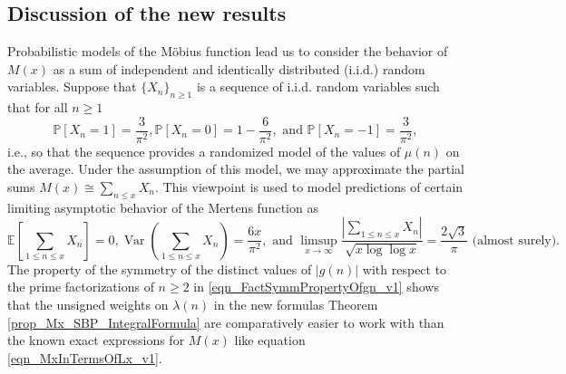 \documentclass[11pt,reqno,a4letter]{article}
\newcommand{\hlocalref}[1]{\hyperref[#1]{\ref{#1}}}
\numberwithin{equation}{section}
\numberwithin{figure}{section}
\numberwithin{table}{section}
\theoremstyle{plain}
\numberwithin{theorem}{section}
\theoremstyle{definition}
\begin{document}
\subsection{Discussion of the new results}

Probabilistic models of the M\"obius function lead us to consider the behavior of $M(x)$ 
as a sum of independent and identically distributed (i.i.d.) random variables. 
Suppose that $\{X_n\}_{n \geq 1}$ is a sequence of i.i.d. random variables 
such that for all $n \geq 1$ 
$$\mathbb{P}[X_n = 1] = \frac{3}{\pi^2}, \mathbb{P}[X_n = 0] = 1 - \frac{6}{\pi^2}, \text{ and }  
  \mathbb{P}[X_n = -1] = \frac{3}{\pi^2},$$ 
i.e., so that the sequence provides a randomized model of the values of $\mu(n)$ on the average. 
Under the assumption of this model, we may approximate the partial sums 
$M(x) \cong \sum_{n \leq x} X_n$. 
This viewpoint is used to model predictions of certain limiting asymptotic behavior of the 
Mertens function as 
\[
\mathbb{E}\left[\sum_{1 \leq n \leq x} X_n\right] = 0, 
     \operatorname{Var}\left(\sum_{1 \leq n \leq x} X_n\right) = \frac{6x}{\pi^2}, 
     \text{ and } 
     \limsup_{x \rightarrow \infty} \frac{\left\lvert \sum\limits_{1 \leq n \leq x} X_n 
     \right\rvert}{\sqrt{x \log\log x}} = \frac{2\sqrt{3}}{\pi}
     \text{ (almost surely).} 
\]
The property of the symmetry of the distinct values of $|g(n)|$ with respect to the 
prime factorizations of $n \geq 2$ in \eqref{eqn_FactSymmPropertyOfgn_v1} 
shows that the unsigned weights on $\lambda(n)$ in 
the new formulas Theorem \hlocalref{prop_Mx_SBP_IntegralFormula} 
are comparatively easier to work with than the known 
exact expressions for $M(x)$ like equation \eqref{eqn_MxInTermsOfLx_v1}. 
\end{document}
